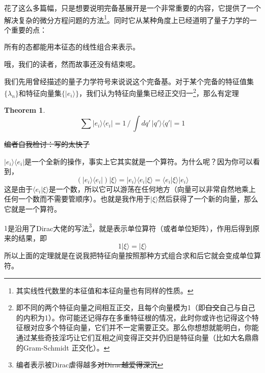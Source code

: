 \documentclass{article}
\newtheorem{theorem}{Theorem}[section]
\numberwithin{equation}{section}
\newcommand{\bra}[1]{\langle #1 |}
\newcommand{\ket}[1]{| #1 \rangle}
\begin{document}
    花了这么多篇幅，只是想要说明完备基展开是一个非常重要的内容，它提供了一个解决复杂的微分方程问题的方法\footnote{其实线性代数里的本征值和本征向量也有同样的性质。}。同时它从某种角度上已经道明了量子力学的一个重要的点：
    \begin{center}
    	所有的态都能用本征态的线性组合来表示。
    \end{center}

    哦，我们的读者，然而故事还没有结束呢。

    我们先用曾经描述的量子力学符号来说说这个完备基。对于某个完备的特征值集$\{\lambda_n\}$和特征向量集$\{| e_i \rangle \}$，我们认为特征向量集已经正交归一\footnote{即不同的两个特征向量之间相互正交，且每个向量模为1（即\sout{自交}自己与自己的内积为1）。你可能还记得存在多重特征根的情况，此时你或许也记得这个特征根对应多个特征向量，它们并不一定需要正交。那么你想想就能明白，你能通过某些奇技淫巧让它们互相之间变得正交并仍旧是特征向量（比如大名鼎鼎的Gram-Schmidt 正交化）。}，那么有定理
    \begin{theorem}
	\begin{equation}
		\sum \ket{e_i}\bra{e_i} = 1 \, / \, \int dq' \, \ket{q'}\bra{q'} = 1
	\end{equation}
    \end{theorem}

    \sout{编者自我检讨：写的太快了}

    $| e_i \rangle \langle e_i | $是一个全新的操作，事实上它其实就是一个算符。为什么呢？因为你可以看到，
    \begin{equation}
	    (| e_i \rangle \langle e_i | ) | \xi \rangle = | e_i \rangle \langle e_i | \xi \rangle = \langle e_i | \xi \rangle | e_i \rangle  
    \end{equation}
    这是由于$ \langle e_i | \xi \rangle $是一个数，所以它可以游荡在任何地方（向量可以非常自然地乘上任何一个数而不需要管顺序）。也就是我作用于$| \xi \rangle $然后获得了一个新的向量，那么它就是一个算符。

    $1$是沿用了Dirac大佬的写法\footnote{编者表示被Dirac虐得越多\sout{对Dirac越爱得深沉}}，就是表示单位算符（或者单位矩阵），作用后得到原来的结果，即
    \begin{equation}
    	1 | \xi \rangle = | \xi \rangle 
    \end{equation}
    所以上面的定理就是在说我把特征向量按照那种方式组合求和后它就会变成单位算符。
\end{document}
